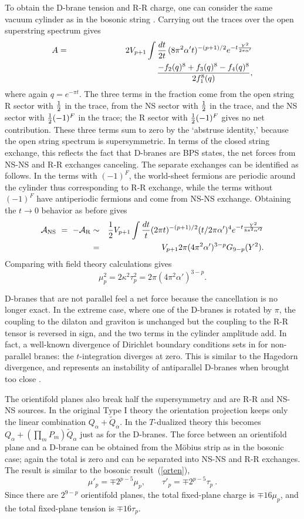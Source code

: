 \documentclass[12pt]{article}
\def\be{\begin{equation}}
\def\ee{\end{equation}}
\def\bea{\begin{eqnarray}}
\def\eea{\end{eqnarray}}
\def\ap{\alpha'}
\begin{document}
To obtain the D-brane tension and R-R charge, one can consider the same
vacuum cylinder as in the bosonic string \cite{joeone}.
Carrying out the traces over the open superstring spectrum
gives
\bea
A &=& 2V_{p+1} \int {dt\over 2t}\, (8\pi^2 \ap t)^{-(p+1)/2}
e^{- t{Y^2\over2\pi \alpha'}} 
\nonumber\\
&& \qquad\qquad\qquad\qquad\qquad \frac{ -f_2(q)^{8}
+ f_3(q)^8 - f_4(q)^8 }{2 f_1^8(q)},
\eea
where again $q =e^{-\pi t}$.
The three terms in the fraction come from the open string R
sector with ${1\over2}$ in the trace, from the NS sector with
${1\over2}$ in the trace, and the NS sector with ${1\over2} (-1)^F$
in the trace; the R sector with ${1\over2} (-1)^F$ gives no net
contribution.  These three terms sum to zero by the `abstruse
identity,' because the open string spectrum is supersymmetric.
In terms of the closed string exchange, this
reflects the fact that D-branes are BPS states, the net forces from
NS-NS and R-R exchanges canceling.  The separate exchanges can be
identified as follows.  In the terms with $(-1)^F$, the world-sheet
fermions are periodic around the cylinder thus corresponding to R-R
exchange, while the terms without $(-1)^F$ have antiperiodic fermions and
come from NS-NS exchange.  Obtaining the $t\to 0$ behavior as before
gives
\bea
{\cal A}_{\rm NS}\ =\ - {\cal A}_{\rm R} 
 &\sim & {1\over2} V_{p+1}  \int{dt\over t} (2\pi
t)^{-(p+1)/2} (t/2\pi\alpha')^4 e^{- t{Y^2\over8\pi^2 \alpha'^2}} 
\nonumber\\
&=& V_{p+1} 2\pi (4\pi^2\alpha')^{3-p} G_{9-p}(Y^2).
\eea 
Comparing with field theory calculations gives\, \cite{joeone}
\be
\mu_p^2 = 2 \kappa^2 \tau_p^2 = 2\pi (4\pi^2\alpha')^{3-p}. \label{dcharge}
\ee

D-branes that are not parallel feel a
net force because the cancellation is no longer exact.  In the extreme case,
where one of the D-branes is rotated by $\pi$, the coupling to the dilaton
and graviton is unchanged but the coupling to the R-R tensor is reversed in
sign, and the two terms in the cylinder amplitude add.  In fact, a
well-known divergence of Dirichlet boundary conditions sets in for
non-parallel branes: the
$t$-integration diverges at zero.  This is similar to the Hagedorn
divergence, and represents an instability of antiparallel D-branes when brought
too close \cite{tomlen}. 

The orientifold planes also break half the supersymmetry and are R-R and
NS-NS sources.  In the original Type I theory the orientation projection
keeps only the linear combination $Q_\alpha + \tilde
Q_\alpha$.  In the $T$-dualized theory this becomes $Q_\alpha + (\prod_m
P_m)
\tilde Q_\alpha$ just as for the D-branes.  The force between an
orientifold plane and a D-brane can be obtained from the M\"obius strip as
in the bosonic case; again the total is zero and can be separated into
NS-NS and R-R exchanges.  The result is similar to the bosonic
result~(\ref{orten}),
\be
\mu'_p = \mp 2^{p - 5} \mu_p, \qquad \tau'_p = \mp 2^{p - 5} \tau_p \ .
\ee
Since there are $2^{9-p}$ orientifold planes, the total fixed-plane charge
is $\mp 16 \mu_p$, and the total fixed-plane tension is $\mp 16 \tau_p$.
\end{document}
